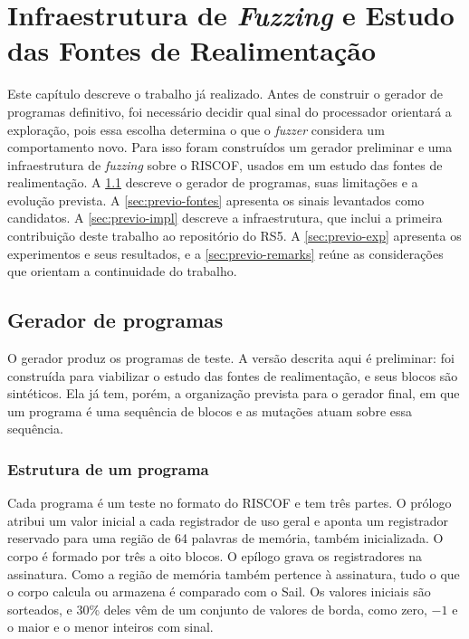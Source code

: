 \chapter{\label{chap:previo}Infraestrutura de \textit{Fuzzing} e Estudo das Fontes de Realimentação}

Este capítulo descreve o trabalho já realizado. Antes de construir o gerador de programas definitivo, foi necessário decidir qual sinal do processador orientará a exploração, pois essa escolha determina o que o \textit{fuzzer} considera um comportamento novo. Para isso foram construídos um gerador preliminar e uma infraestrutura de \textit{fuzzing} sobre o RISCOF, usados em um estudo das fontes de realimentação. A \cref{sec:previo-gerador} descreve o gerador de programas, suas limitações e a evolução prevista. A \cref{sec:previo-fontes} apresenta os sinais levantados como candidatos. A \cref{sec:previo-impl} descreve a infraestrutura, que inclui a primeira contribuição deste trabalho ao repositório do RS5. A \cref{sec:previo-exp} apresenta os experimentos e seus resultados, e a \cref{sec:previo-remarks} reúne as considerações que orientam a continuidade do trabalho.

\section{Gerador de programas}\label{sec:previo-gerador}

O gerador produz os programas de teste. A versão descrita aqui é preliminar: foi construída para viabilizar o estudo das fontes de realimentação, e seus blocos são sintéticos. Ela já tem, porém, a organização prevista para o gerador final, em que um programa é uma sequência de blocos e as mutações atuam sobre essa sequência.

\subsection{Estrutura de um programa}\label{sec:previo-gerador-estrutura}

Cada programa é um teste no formato do RISCOF e tem três partes. O prólogo atribui um valor inicial a cada registrador de uso geral e aponta um registrador reservado para uma região de 64 palavras de memória, também inicializada. O corpo é formado por três a oito blocos. O epílogo grava os registradores na assinatura. Como a região de memória também pertence à assinatura, tudo o que o corpo calcula ou armazena é comparado com o Sail. Os valores iniciais são sorteados, e 30\% deles vêm de um conjunto de valores de borda, como zero, $-1$ e o maior e o menor inteiros com sinal.

